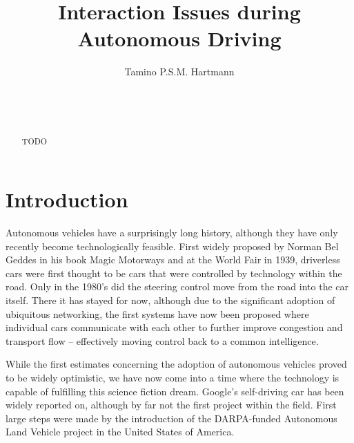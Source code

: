 \documentclass{acm_proc_article-sp}
\begin{document}

\title{Interaction Issues during Autonomous Driving}

\author{
\alignauthor
Tamino P.S.M. Hartmann\\
       \\
       \\
       \\
}

\maketitle
\begin{abstract}
TODO
\end{abstract}


\section{Introduction}

Autonomous vehicles have a surprisingly long history, although they have only recently become technologically feasible.
First widely proposed by Norman Bel Geddes in his book Magic Motorways \cite{geddes2009magic} and at the World Fair in 1939, driverless cars were first thought to be cars that were controlled by technology within the road.
Only in the 1980's did the steering control move from the road into the car itself.
There it has stayed for now, although due to the significant adoption of ubiquitous networking, the first systems have now been proposed where individual cars communicate with each other to further improve congestion and transport flow – effectively moving control back to a common intelligence.

While the first estimates concerning the adoption of autonomous vehicles proved to be widely optimistic, we have now come into a time where the technology is capable of fulfilling this science fiction dream.
Google's self-driving car \cite{www:google_car} has been widely reported on, although by far not the first project within the field.
First large steps were made by the introduction of the DARPA-funded Autonomous Land Vehicle project in the United States of America.
\end{document}
